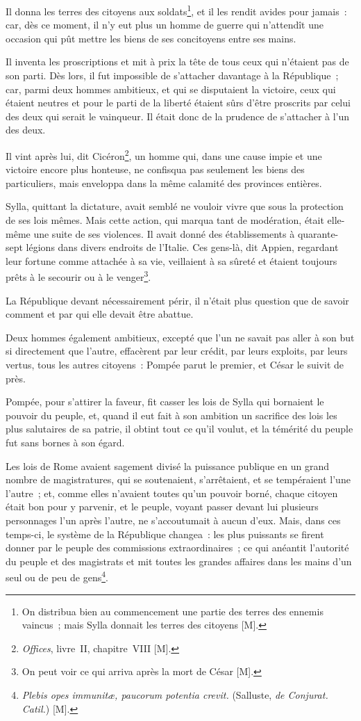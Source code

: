\documentclass[french,twoside]{book} %
\begin{document}
Il donna les terres des citoyens aux soldats\footnote{On distribua bien au commencement une partie des terres des ennemis vaincus ; mais Sylla donnait les terres des citoyens [M].}, et il les rendit avides pour jamais : car, dès ce moment, il n’y eut plus un homme de guerre qui n’attendît une occasion qui pût mettre les biens de ses concitoyens entre ses mains.\par
Il inventa les proscriptions et mit à prix la tête de tous ceux qui n’étaient pas de son parti. Dès lors, il fut impossible de s’attacher davantage à la République ; car, parmi deux hommes ambitieux, et qui se disputaient la victoire, ceux qui étaient neutres et pour le parti de la liberté étaient sûrs d’être proscrits par celui des deux qui serait le vainqueur. Il était donc de la prudence de s’attacher à l’un des deux.\par
Il vint après lui, dit Cicéron\footnote{{\itshape Offices}, livre II, chapitre VIII [M].}, un homme qui, dans une cause impie et une victoire encore plus honteuse, ne confisqua pas seulement les biens des particuliers, mais enveloppa dans la même calamité des provinces entières.\par
Sylla, quittant la dictature, avait semblé ne vouloir vivre que sous la protection de ses lois mêmes. Mais cette action, qui marqua tant de modération, était elle-même une suite de ses violences. Il avait donné des établissements à quarante-sept légions dans divers endroits de l’Italie. Ces gens-là, dit Appien, regardant leur fortune comme attachée à sa vie, veillaient à sa sûreté et étaient toujours prêts à le secourir ou à le venger\footnote{On peut voir ce qui arriva après la mort de César [M].}.\par
La République devant nécessairement périr, il n’était plus question que de savoir comment et par qui elle devait être abattue.\par
Deux hommes également ambitieux, excepté que l’un ne savait pas aller à son but si directement que l’autre, effacèrent par leur crédit, par leurs exploits, par leurs vertus, tous les autres citoyens : Pompée parut le premier, et César le suivit de près.\par
Pompée, pour s’attirer la faveur, fit casser les lois de Sylla qui bornaient le pouvoir du peuple, et, quand il eut fait à son ambition un sacrifice des lois les plus salutaires de sa patrie, il obtint tout ce qu’il voulut, et la témérité du peuple fut sans bornes à son égard.\par
Les lois de Rome avaient sagement divisé la puissance publique en un grand nombre de magistratures, qui se soutenaient, s’arrêtaient, et se tempéraient l’une l’autre ; et, comme elles n’avaient toutes qu’un pouvoir borné, chaque citoyen était bon pour y parvenir, et le peuple, voyant passer devant lui plusieurs personnages l’un après l’autre, ne s’accoutumait à aucun d’eux. Mais, dans ces temps-ci, le système de la République changea : les plus puissants se firent donner par le peuple des commissions extraordinaires ; ce qui anéantit l’autorité du peuple et des magistrats et mit toutes les grandes affaires dans les mains d’un seul ou de peu de gens\footnote{{\itshape Plebis opes immunitæ, paucorum potentia crevit.} (Salluste, {\itshape de Conjurat. Catil.}) [M].}.\par
\end{document}
